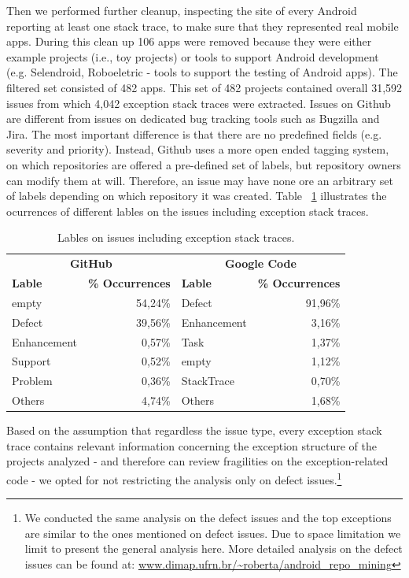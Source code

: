 \documentclass[conference]{IEEEtran}
\begin{document}
Then we performed further cleanup, inspecting the site of every Android
reporting at least one stack trace, to make sure that they represented real
mobile apps. During this clean up 106 apps were removed because they were either
example projects (i.e., toy projects) or tools to support Android development
(e.g. Selendroid, Roboeletric - tools to support the testing of Android apps).
The filtered set consisted of 482 apps. This set of 482 projects contained overall 31,592 issues from which 4,042 exception stack traces 
were extracted. Issues on Github are different from issues on dedicated bug tracking tools such as 
Bugzilla and Jira. The most important difference is that there are no predefined fields
  (e.g. severity and priority). Instead, Github uses a more open ended tagging system, on which
repositories are offered a pre-defined set of labels, but repository owners can modify 
them at will. Therefore, an issue may have none ore an arbitrary set of labels depending 
on which repository it was created. Table ~\ref{tab:lables} illustrates the ocurrences of different lables 
on the issues including exception stack traces.



\begin{table}
  \centering
  \begin{tabular}{lr|lr}
    \hline
     \multicolumn{2}{c}{\bfseries{GitHub}} &  \multicolumn{2}{c}{\bfseries{Google Code}} \\
      \bfseries{Lable} &  \bfseries{\% Occurrences} &  \bfseries{Lable} &  \bfseries{\% Occurrences} \\
    \hline
empty &	54,24\% & Defect &	91,96\% \\
Defect &	39,56\%  & Enhancement  &	3,16\% \\
Enhancement &	0,57\% & Task	& 1,37\% \\
Support &	0,52\% & empty &	1,12\% \\
Problem &	0,36\% & StackTrace &	0,70\% \\
Others &	4,74\% &  Others &	1,68\% \\   
  \hline
  \end{tabular}
  \caption{Lables on issues including exception stack traces.}
  \label{tab:lables}
\end{table}

Based on the assumption that regardless the issue type, every exception stack
trace contains relevant information concerning the exception structure of the
projects analyzed - and therefore can review fragilities on the exception-related code -  
we opted for not restricting the analysis only on defect
issues.\footnote{We conducted the same analysis on the defect issues and the top
exceptions are similar to the ones mentioned on defect issues. Due to space
limitation we limit to present the general analysis here. More detailed analysis
on the defect issues can be found at:
\url{www.dimap.ufrn.br/~roberta/android_repo_mining}}
\end{document}
